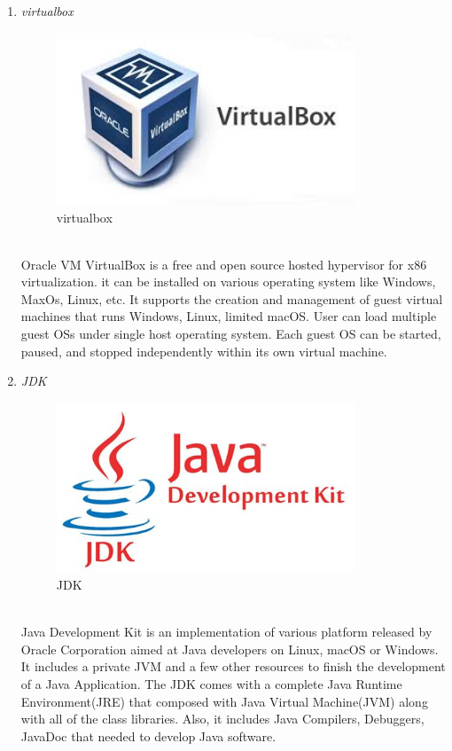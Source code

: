 \documentclass[conference]{IEEEtran}
\begin{document}
\begin{enumerate}
    \item \textit{virtualbox }
                    \begin{figure}[htbp]
	\centerline{\includegraphics[width=89mm, scale=0.5]{fig/virtual_box.jpg}}
	\caption{virtualbox}
	\label{fig}
	\end{figure}
   \\Oracle VM VirtualBox is a free and open source hosted hypervisor for x86 virtualization. it can be installed on various operating system like Windows, MaxOs, Linux, etc. It supports the creation and management of guest virtual machines that runs Windows, Linux, limited macOS. User can load multiple guest OSs under single host operating system. Each guest OS can be started, paused, and stopped independently within its own virtual machine.\\
   \item \textit{JDK }
                   \begin{figure}[htbp]
	\centerline{\includegraphics[width=89mm, scale=0.5]{fig/jdk.png}}
	\caption{JDK}
	\label{fig}
	\end{figure}
   \\Java Development Kit is an implementation of various platform released by Oracle Corporation aimed at Java developers on Linux, macOS or Windows. It includes a private JVM and a few other resources to finish the development of a Java Application.  The JDK comes with a complete Java Runtime Environment(JRE) that composed with  Java Virtual Machine(JVM) along with all of the class libraries. Also, it includes Java Compilers, Debuggers, JavaDoc that needed to develop Java software.\\

\end{enumerate}
\end{document}
